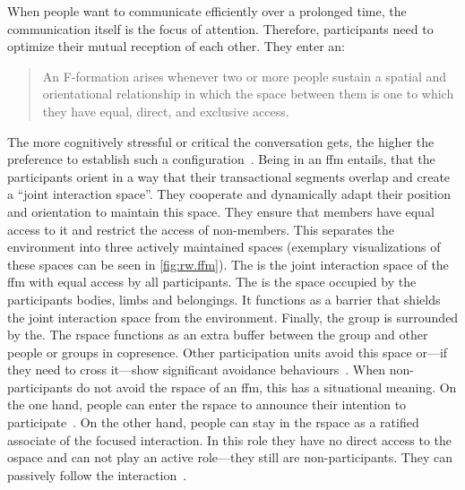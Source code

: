 When people want to communicate efficiently over a prolonged time, the communication itself is the focus of attention.
Therefore, participants need to optimize their mutual reception of each other.
They enter an:
\blockcquote[p. 209]{kendon1990}{An F-formation arises whenever two or more people sustain a spatial and orientational relationship in which the space between them is one to which they have equal, direct, and exclusive access.}
The more cognitively stressful or critical the \gls{conversation} gets, the higher the preference to establish such a configuration~\cite[p. 10]{Auer}.
Being in an \gls{ffm} entails, that the participants orient in a way that their \glspl{transactional segment} overlap and create a \enquote{joint interaction space}.
They cooperate and dynamically adapt their position and orientation to maintain this space.
They ensure that members have equal access to it and restrict the access of non-members.
This separates the environment into three actively maintained spaces (exemplary visualizations of these spaces can be seen in \cref{fig:rw.ffm}).
The is the joint interaction space of the \gls{ffm} with equal access by all participants.
The is the space occupied by the participants bodies, limbs and belongings.
It functions as a barrier that shields the joint interaction space from the environment.
Finally, the group is surrounded by the.
The \gls{rspace} functions as an extra buffer between the group and other people or groups in \gls{copresence}.
Other \glspl{participation unit} avoid this space or---if they need to cross it---show significant avoidance behaviours~\cite[p. 241--260]{Ciolek1980}.
When \glspl{non-participant} do not avoid the \gls{rspace} of an \gls{ffm}, this has a situational meaning.
On the one hand, people can enter the \gls{rspace} to announce their intention to participate~\cite[p. 231]{kendon1990}.
On the other hand, people can stay in the \gls{rspace} as a ratified associate of the \gls{focused interaction}.
In this role they have no direct access to the \gls{ospace} and can not play an active role---they still are \glspl{non-participant}.
They can passively follow the interaction~\cite[p. 233]{kendon1990}.


